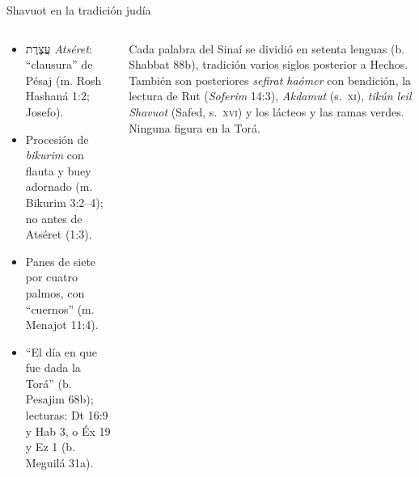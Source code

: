 \documentclass[hyperref={bookmarks=false},aspectratio=169]{beamer}
\newcommand{\heb}[1]{\mbox{\foreignlanguage{hebrew}{#1}}}
\begin{document}
\begin{frame}{Shavuot en la tradición judía}
\begin{columns}[t,onlytextwidth]
\begin{column}{0.49\textwidth}\small\RaggedRight
\begin{itemize}
\item \heb{עֲצֶרֶת} \emph{Atséret}: ``clausura'' de Pésaj (m. Rosh Hashaná 1:2; Josefo).
\item Procesión de \emph{bikurim} con flauta y buey adornado (m. Bikurim 3:2--4); no antes de Atséret (1:3).
\item Panes de siete por cuatro palmos, con ``cuernos'' (m. Menajot 11:4).
\item ``El día en que fue dada la Torá'' (b. Pesajim 68b); lecturas: Dt 16:9 y Hab 3, o Éx 19 y Ez 1 (b. Meguilá 31a).
\end{itemize}
\end{column}
\begin{column}{0.49\textwidth}
\begin{tcolorbox}[colback=mostaza!10,colframe=mostaza!85!tierraroja,boxrule=0.6pt,arc=2pt,left=4pt,right=4pt,fonttitle=\bfseries\scriptsize,coltitle=caferojizo,colbacktitle=mostaza!30,title={Precisión: prácticas posteriores}]
\scriptsize\RaggedRight Cada palabra del Sinaí se dividió en setenta lenguas (b. Shabbat 88b), tradición varios siglos posterior a Hechos. También son posteriores \emph{sefirat haómer} con bendición, la lectura de Rut (\emph{Soferim} 14:3), \emph{Akdamut} (s.~\textsc{xi}), \emph{tikún leil Shavuot} (Safed, s.~\textsc{xvi}) y los lácteos y las ramas verdes. Ninguna figura en la Torá.
\end{tcolorbox}
\end{column}
\end{columns}
\end{frame}
\end{document}
